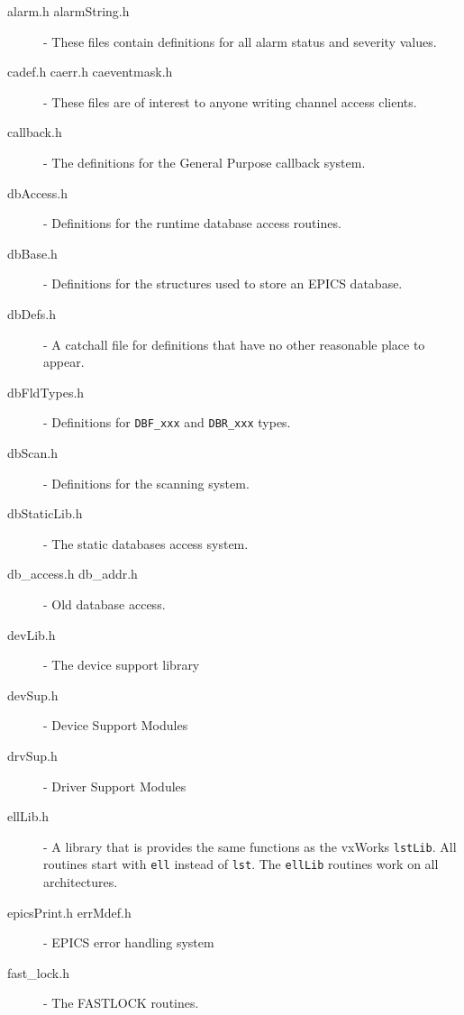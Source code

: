 \begin{description}

\item[alarm.h alarmString.h] - These files contain definitions for all alarm status and severity values.

\item[cadef.h caerr.h caeventmask.h] - These files are of interest to anyone writing channel access clients.

\item[callback.h] - The definitions for the General Purpose callback system.

\item[dbAccess.h] - Definitions for the runtime database access routines.

\item[dbBase.h] - Definitions for the structures used to store an EPICS database.

\item[dbDefs.h] - A catchall file for definitions that have no other reasonable place to appear.

\item[dbFldTypes.h] - Definitions for \verb|DBF_xxx| and \verb|DBR_xxx| types.

\item[dbScan.h] - Definitions for the scanning system.

\item[dbStaticLib.h] - The static databases access system.

\item[db\_access.h db\_addr.h] - Old database access.

\item[devLib.h] - The device support library

\item[devSup.h] - Device Support Modules

\item[drvSup.h] - Driver Support Modules

\item[ellLib.h] - A library that is provides the same functions as the vxWorks \verb|lstLib|. All routines start with \verb|ell| instead of 
\verb|lst|.  The \verb|ellLib| routines work on all architectures.

\item[epicsPrint.h errMdef.h] - EPICS error handling system

\item[fast\_lock.h] - The FASTLOCK routines.


\end{description}
